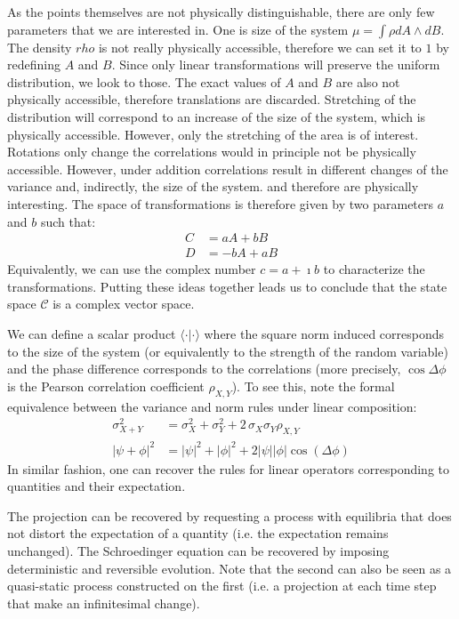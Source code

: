 \documentclass[11pt,letterpaper,fleqn]{memoir} %
\begin{document}
As the points themselves are not physically distinguishable, there are only few parameters that we are interested in. One is size of the system $\mu = \int \rho dA \wedge dB$. The density $rho$ is not really physically accessible, therefore we can set it to $1$ by redefining $A$ and $B$. Since only linear transformations will preserve the uniform distribution, we look to those. The exact values of $A$ and $B$ are also not physically accessible, therefore translations are discarded. Stretching of the distribution will correspond to an increase of the size of the system, which is physically accessible. However, only the stretching of the area is of interest. Rotations only change the correlations would in principle not be physically accessible. However, under addition correlations result in different changes of the variance and, indirectly, the size of the system. and therefore are physically interesting. The space of transformations is therefore given by two parameters $a$ and $b$ such that:
\begin{equation}
\begin{aligned}
C &= a A + b B \\
D &= -b A + a B
\end{aligned}
\end{equation}
Equivalently, we can use the complex number $c = a + \imath b$ to characterize the transformations. Putting these ideas together leads us to conclude that the state space $\mathcal{C}$ is a complex vector space.

We can define a scalar product $\langle \cdot | \cdot \rangle$ where the square norm induced corresponds to the size of the system (or equivalently to the strength of the random variable) and the phase difference corresponds to the correlations (more precisely, $\cos \Delta \phi $ is the Pearson correlation coefficient $\rho_{X,Y}$). To see this, note the formal equivalence between the variance and norm rules under linear composition:
\begin{equation}
\begin{aligned}
\sigma^2_{X+Y} &= \sigma^2_{X} + \sigma^2_{Y} + 2 \, \sigma_{X} \sigma_{Y} \rho_{X,Y} \\
|\psi+\phi|^2&=|\psi|^2 + |\phi|^2 + 2 |\psi||\phi|\cos(\Delta \phi)
\end{aligned}
\end{equation}
In similar fashion, one can recover the rules for linear operators corresponding to quantities and their expectation.

The projection can be recovered by requesting a process with equilibria that does not distort the expectation of a quantity (i.e. the expectation remains unchanged). The Schroedinger equation can be recovered by imposing deterministic and reversible evolution. Note that the second can also be seen as a quasi-static process constructed on the first (i.e. a projection at each time step that make an infinitesimal change).
\end{document}
